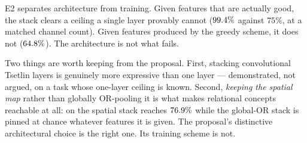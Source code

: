  E2 separates architecture from training. Given
features that are actually good, the stack clears a ceiling a single layer provably cannot
($99.4{}\%$ against $75\%$, at a matched channel count). Given
features produced by the greedy scheme, it does not ($64.8{}\%$). The architecture
is not what fails.

\begin{ttcallout}
Two things are worth keeping from the proposal. First, stacking convolutional Tsetlin layers
is genuinely more expressive than one layer --- demonstrated, not argued, on a task whose
one-layer ceiling is known. Second, \emph{keeping the spatial map} rather than globally
OR-pooling it is what makes relational concepts reachable at all: on  the spatial
stack reaches $76.9{}\%$ while the global-OR stack is pinned at chance whatever
features it is given. The proposal's distinctive architectural choice is the right one. Its
training scheme is not.
\end{ttcallout}
